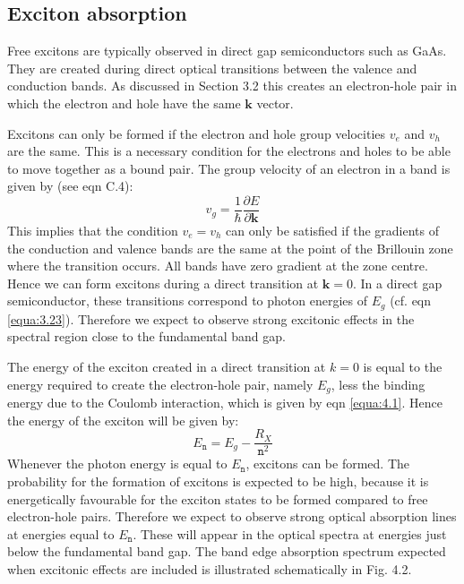 \documentclass[12pt]{book}
\begin{document}
\subsection{Exciton absorption}

Free excitons are typically observed in direct gap semiconductors such as GaAs. They are created during direct optical transitions between the valence and conduction bands. As discussed in Section 3.2 this creates an electron-hole pair in which the electron and hole have the same $\mathbf{k}$ vector.

Excitons can only be formed if the electron and hole group velocities $v_e$ and $v_h$ are the same. This is a necessary condition for the electrons and holes to be able to move together as a bound pair. The group velocity of an electron in a band is given by (see eqn C.4):
\begin{equation}\label{equa:4.3}
  v_g=\frac{1}{\hbar}\frac{\partial E}{\partial \mathbf{k}}
\end{equation}
This implies that the condition $v_e=v_h$ can only be satisfied if the gradients of the conduction and valence bands are the same at the point of the Brillouin zone where the transition occurs. All bands have zero gradient at the zone centre. Hence we can form excitons during a direct transition at $\mathbf{k} = 0$. In a direct gap semiconductor, these transitions correspond to photon energies of $E_g$ (cf. eqn \ref{equa:3.23}). Therefore we expect to observe strong excitonic effects in the spectral region close to the fundamental band gap.

The energy of the exciton created in a direct transition at $k = 0$ is equal to the energy required to create the electron-hole pair, namely $E_g$, less the binding energy due to the Coulomb interaction, which is given by eqn \ref{equa:4.1}. Hence the energy of the exciton will be given by:
\begin{equation}\label{equa:4.4}
  E_{\texttt{n}}=E_g-\frac{R_X}{\texttt{n}^2}
\end{equation}
Whenever the photon energy is equal to $E_{\texttt{n}}$, excitons can be formed. The probability for the formation of excitons is expected to be high, because it is energetically favourable for the exciton states to be formed compared to free electron-hole pairs. Therefore we expect to observe strong optical absorption lines at energies equal to $E_{\texttt{n}}$. These will appear in the optical spectra at energies just below the fundamental band gap. The band edge absorption spectrum expected when excitonic effects are included is illustrated schematically in Fig. 4.2.
\end{document}
